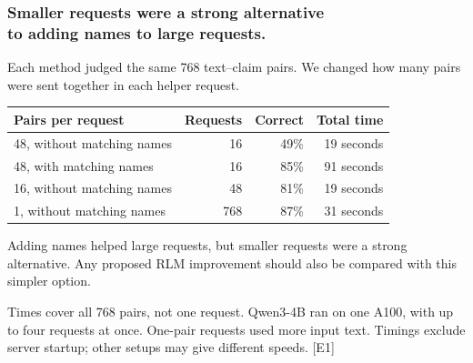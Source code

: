 \documentclass[aspectratio=169,11pt]{beamer}
\newcommand{\smallnote}[1]{\vfill{\scriptsize\color{Muted}#1\par}}
\begin{document}
\begin{frame}[t]
\frametitle{Smaller requests were a strong alternative\\to adding names to large requests.}
Each method judged the same 768 text--claim pairs. We changed how many pairs were sent together in each helper request.\par
\vspace{2mm}
\centering
\renewcommand{\arraystretch}{1.15}
\begin{tabular}{lrrr}
\toprule
Pairs per request & Requests & Correct & Total time \\
\midrule
48, without matching names & 16 & 49\% & 19 seconds \\
48, with matching names & 16 & 85\% & 91 seconds \\
16, without matching names & 48 & 81\% & 19 seconds \\
1, without matching names & 768 & 87\% & 31 seconds \\
\bottomrule
\end{tabular}
\par\vspace{2mm}
\raggedright
Adding names helped large requests, but smaller requests were a strong alternative. Any proposed RLM improvement should also be compared with this simpler option.
\smallnote{Times cover all 768 pairs, not one request. Qwen3-4B ran on one A100, with up to four requests at once. One-pair requests used more input text. Timings exclude server startup; other setups may give different speeds. [E1]}
\end{frame}
\end{document}

